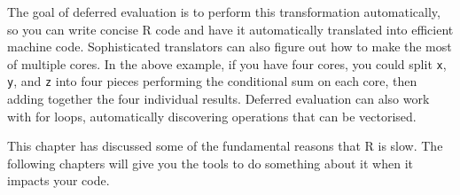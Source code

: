 The goal of deferred evaluation is to perform this transformation
automatically, so you can write concise R code and have it automatically
translated into efficient machine code. Sophisticated translators can
also figure out how to make the most of multiple cores. In the above
example, if you have four cores, you could split \texttt{x}, \texttt{y},
and \texttt{z} into four pieces performing the conditional sum on each
core, then adding together the four individual results. Deferred
evaluation can also work with for loops, automatically discovering
operations that can be vectorised.

This chapter has discussed some of the fundamental reasons that R is
slow. The following chapters will give you the tools to do something
about it when it impacts your code.

